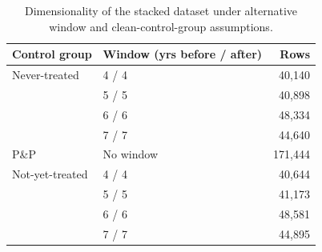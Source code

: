 \begin{table}[t]
\centering
\label{tab:stacked-dim-b}
\begin{tabular}{llr}
\toprule
Control group & Window (yrs before / after) & Rows \\
\midrule
Never-treated  & 4 / 4 & 40,140 \\
 & 5 / 5 & 40,898 \\
 & 6 / 6 & 48,334 \\
 & 7 / 7 & 44,640 \\
 P\&P & No window & 171,444 \\
\midrule
Not-yet-treated  & 4 / 4 & 40,644 \\
 & 5 / 5 & 41,173 \\
 & 6 / 6 & 48,581 \\
 & 7 / 7 & 44,895 \\
\bottomrule
\end{tabular}
\caption{Dimensionality of the stacked dataset under alternative window and clean-control-group assumptions.}
\end{table}
